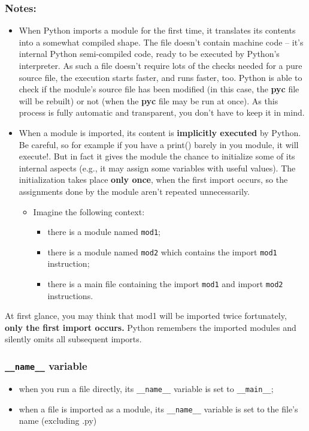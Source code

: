 \documentclass[11pt]{article}
\begin{document}
\subsubsection{Notes:}
\label{sec:org00816c0}
\begin{itemize}
\item When Python imports a module for the first time, it translates
its contents into a somewhat compiled shape. The file doesn’t contain
machine code – it’s internal Python semi-compiled code, ready to be
executed by Python’s interpreter. As such a file doesn’t require lots
of the checks needed for a pure source file, the execution starts
faster, and runs faster, too. Python is able to check if the module’s
source file has been modified (in this case, the \textbf{pyc} file will be
rebuilt) or not (when the \textbf{pyc} file may be run at once). As this
process is fully automatic and transparent, you don’t have to keep it
in mind.

\item When a module is imported, its content is \textbf{implicitly
executed} by Python. Be careful, so for example if you have a print()
barely in you module, it will execute!. But in fact it gives the
module the chance to initialize some of its internal aspects (e.g., it
may assign some variables with useful values). The initialization
takes place \textbf{only once}, when the first import occurs, so the
assignments done by the module aren’t repeated unnecessarily.

\begin{itemize}
\item Imagine the following context:

\begin{itemize}
\item there is a module named \texttt{mod1};
\item there is a module named \texttt{mod2} which contains the import \texttt{mod1}
instruction;
\item there is a main file containing the import \texttt{mod1} and import \texttt{mod2}
instructions.
\end{itemize}
\end{itemize}
\end{itemize}

At first glance, you may think that mod1 will be imported twice
fortunately, \textbf{only the first import occurs.} Python remembers the
imported modules and silently omits all subsequent imports.

\subsubsection{\texttt{\_\_name\_\_} variable}
\label{sec:org50b5bb1}
\begin{itemize}
\item when you run a file directly, its \texttt{\_\_name\_\_} variable is set to
\texttt{\_\_main\_\_};
\item when a file is imported as a module, its \texttt{\_\_name\_\_} variable is set to
the file’s name (excluding .py)
\end{itemize}
\end{document}
